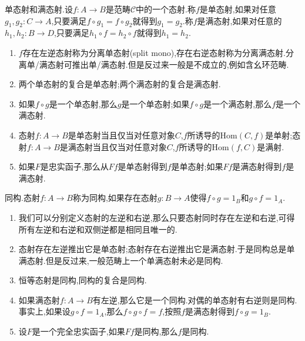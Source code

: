单态射和满态射.设$f:A\to B$是范畴$\mathscr{C}$中的一个态射.称$f$是单态射,如果对任意$g_1,g_2:C\to A$,只要满足$f\circ g_1=f\circ g_2$就得到$g_1=g_2$.称$f$是满态射,如果对任意的$h_1,h_2:B\to D$,只要满足$h_1\circ f=h_2\circ f$就得到$h_1=h_2$.
\begin{enumerate}
	\item $f$存在左逆态射称为分离单态射(split mono),存在右逆态射称为分离满态射.分离单/满态射可推出单/满态射.但是反过来一般是不成立的,例如含幺环范畴.
	\item 两个单态射的复合是单态射;两个满态射的复合是满态射.
	\item 如果$f\circ g$是一个单态射,那么$g$是一个单态射;如果$f\circ g$是一个满态射,那么$f$是一个满态射.
	\item 态射$f:A\to B$是单态射当且仅当对任意对象$C$,$f$所诱导的$\mathrm{Hom}(C,f)$是单射;态射$f:A\to B$是满态射当且仅当对任意对象$C$,$f$所诱导的$\mathrm{Hom}(f,C)$是满射.
	\item 如果$F$是忠实函子,那么从$Ff$是单态射得到$f$是单态射;如果$Ff$是满态射得到$f$是满态射.
\end{enumerate}

同构.态射$f:A\to B$称为同构,如果存在态射$g:B\to A$使得$f\circ g=1_B$和$g\circ f=1_A$.
\begin{enumerate}
	\item 我们可以分别定义态射的左逆和右逆,那么只要态射同时存在左逆和右逆,可得所有左逆和右逆和双侧逆都是相同且唯一的.
	\item 态射存在左逆推出它是单态射;态射存在右逆推出它是满态射.于是同构总是单满态射.但是反过来,一般范畴上一个单满态射未必是同构.
	\item 恒等态射是同构,同构的复合是同构.
	\item 如果满态射$f:A\to B$有左逆,那么它是一个同构.对偶的单态射有右逆则是同构.事实上,如果设$g\circ f=1_A$,那么$f\circ g\circ f=f$,按照$f$是满态射得到$f\circ g=1_B$.
	\item 设$F$是一个完全忠实函子,如果$Ff$是同构,那么$f$是同构.
\end{enumerate}

